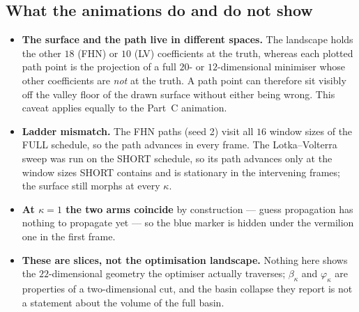 \documentclass[10pt]{article}
\begin{document}
\subsection{What the animations do and do not show}
\begin{itemize}[leftmargin=1.4em, itemsep=1pt]
\item \textbf{The surface and the path live in different spaces.} The landscape holds the other $18$
(FHN) or $10$ (LV) coefficients at the truth, whereas each plotted path point is the projection of a
full $20$- or $12$-dimensional minimiser whose other coefficients are \emph{not} at the truth. A path
point can therefore sit visibly off the valley floor of the drawn surface without either being wrong.
This caveat applies equally to the Part~C animation.
\item \textbf{Ladder mismatch.} The FHN paths (seed 2) visit all $16$ window sizes of the FULL schedule,
so the path advances in every frame. The Lotka--Volterra sweep was run on the SHORT schedule, so its
path advances only at the window sizes SHORT contains and is stationary in the intervening frames; the
surface still morphs at every $\kappa$.
\item \textbf{At $\kappa=1$ the two arms coincide} by construction --- guess propagation has nothing to
propagate yet --- so the blue marker is hidden under the vermilion one in the first frame.
\item \textbf{These are slices, not the optimisation landscape.} Nothing here shows the $22$-dimensional
geometry the optimiser actually traverses; $\beta_\kappa$ and $\varphi_\kappa$ are properties of a
two-dimensional cut, and the basin collapse they report is not a statement about the volume of the full
basin.
\end{itemize}
\end{document}
